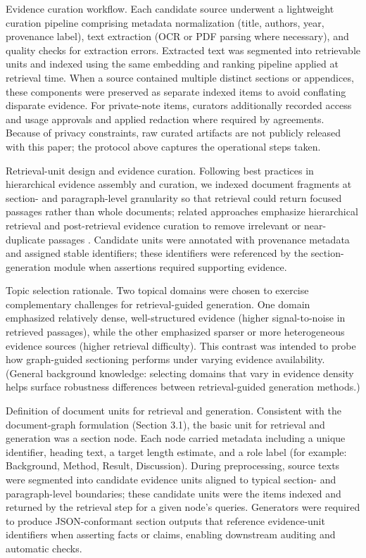 \documentclass{article}%
\begin{document}
Evidence curation workflow. Each candidate source underwent a lightweight curation pipeline comprising metadata normalization (title, authors, year, provenance label), text extraction (OCR or PDF parsing where necessary), and quality checks for extraction errors. Extracted text was segmented into retrievable units and indexed using the same embedding and ranking pipeline applied at retrieval time. When a source contained multiple distinct sections or appendices, these components were preserved as separate indexed items to avoid conflating disparate evidence. For private-note items, curators additionally recorded access and usage approvals and applied redaction where required by agreements. Because of privacy constraints, raw curated artifacts are not publicly released with this paper; the protocol above captures the operational steps taken.

Retrieval-unit design and evidence curation. Following best practices in hierarchical evidence assembly and curation, we indexed document fragments at section- and paragraph-level granularity so that retrieval could return focused passages rather than whole documents; related approaches emphasize hierarchical retrieval and post-retrieval evidence curation to remove irrelevant or near-duplicate passages \cite{web_choe_2025_hierarchical_retrieval_with_evidence_curation_fo}. Candidate units were annotated with provenance metadata and assigned stable identifiers; these identifiers were referenced by the section-generation module when assertions required supporting evidence.

Topic selection rationale. Two topical domains were chosen to exercise complementary challenges for retrieval-guided generation. One domain emphasized relatively dense, well-structured evidence (higher signal-to-noise in retrieved passages), while the other emphasized sparser or more heterogeneous evidence sources (higher retrieval difficulty). This contrast was intended to probe how graph-guided sectioning performs under varying evidence availability. (General background knowledge: selecting domains that vary in evidence density helps surface robustness differences between retrieval-guided generation methods.)

Definition of document units for retrieval and generation. Consistent with the document-graph formulation (Section 3.1), the basic unit for retrieval and generation was a section node. Each node carried metadata including a unique identifier, heading text, a target length estimate, and a role label (for example: Background, Method, Result, Discussion). During preprocessing, source texts were segmented into candidate evidence units aligned to typical section- and paragraph-level boundaries; these candidate units were the items indexed and returned by the retrieval step for a given node's queries. Generators were required to produce JSON-conformant section outputs that reference evidence-unit identifiers when asserting facts or claims, enabling downstream auditing and automatic checks.
\end{document}
